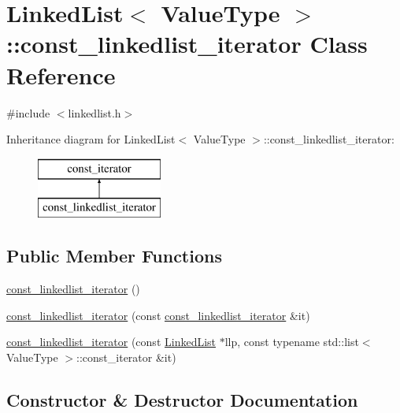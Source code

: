 \hypertarget{classLinkedList_1_1const__linkedlist__iterator}{}\section{Linked\+List$<$ Value\+Type $>$\+:\+:const\+\_\+linkedlist\+\_\+iterator Class Reference}
\label{classLinkedList_1_1const__linkedlist__iterator}


{\ttfamily \#include $<$linkedlist.\+h$>$}

Inheritance diagram for Linked\+List$<$ Value\+Type $>$\+:\+:const\+\_\+linkedlist\+\_\+iterator\+:\begin{figure}[H]
\begin{center}
\leavevmode
\includegraphics[height=2.000000cm]{classLinkedList_1_1const__linkedlist__iterator}
\end{center}
\end{figure}
\subsection*{Public Member Functions}
\begin{DoxyCompactItemize}
\item 
\mbox{\hyperlink{classLinkedList_1_1const__linkedlist__iterator_abf8e5f03972fb8e43ac6e2ce9e186b2d}{const\+\_\+linkedlist\+\_\+iterator}} ()
\item 
\mbox{\hyperlink{classLinkedList_1_1const__linkedlist__iterator_a4838c4a89b4067214ccac47c37a167b2}{const\+\_\+linkedlist\+\_\+iterator}} (const \mbox{\hyperlink{classLinkedList_1_1const__linkedlist__iterator}{const\+\_\+linkedlist\+\_\+iterator}} \&it)
\item 
\mbox{\hyperlink{classLinkedList_1_1const__linkedlist__iterator_ac65f6fbe021813e29648526b8e0f1799}{const\+\_\+linkedlist\+\_\+iterator}} (const \mbox{\hyperlink{classLinkedList}{Linked\+List}} $\ast$llp, const typename std\+::list$<$ Value\+Type $>$\+::const\+\_\+iterator \&it)
\end{DoxyCompactItemize}


\subsection{Constructor \& Destructor Documentation}
\mbox{\label{classLinkedList_1_1const__linkedlist__iterator_abf8e5f03972fb8e43ac6e2ce9e186b2d}} 
